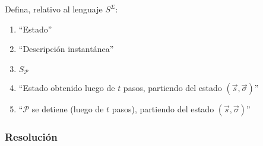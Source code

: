 \documentclass[
]{article}
\providecommand{\tightlist}{%
  \setlength{\itemsep}{0pt}\setlength{\parskip}{0pt}}
\begin{document}
Defina, relativo al lenguaje \(S^\Sigma\):

\begin{enumerate}
\def\labelenumi{\arabic{enumi}.}
\tightlist
\item
  ``Estado''
\item
  ``Descripción instantánea''
\item
  \(S_\mathcal{P}\)
\item
  ``Estado obtenido luego de \(t\) pasos, partiendo del estado
  \((\vec{s},\vec{\sigma})\)''
\item
  ``\(\mathcal{P}\) se detiene (luego de \(t\) pasos), partiendo del
  estado \((\vec{s},\vec{\sigma})\)''
\end{enumerate}

\subsubsection{Resolución}\label{resoluciuxf3n-9}
\end{document}
